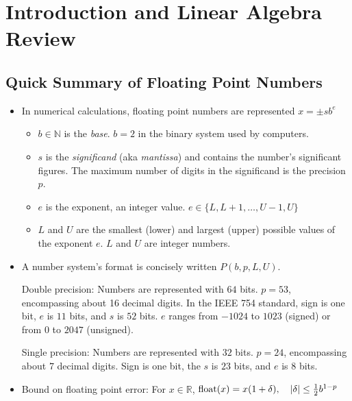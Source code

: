 \documentclass[11pt, a4paper]{article}
\newcommand{\R}{\mathbb{R}} %
\begin{document}
\newpage

\tableofcontents

\newpage

\section{Introduction and Linear Algebra Review}

\subsection{Quick Summary of Floating Point Numbers}
\begin{itemize}
	\item In numerical calculations, floating point numbers are represented $ x = \pm s b^{e} $
	\begin{itemize}
		\item $ b \in \mathbb{N}$ is the \textit{base}. $ b = 2 $ in the binary system used by computers.
		\item $ s $ is the \textit{significand} (aka \textit{mantissa}) and contains the number's significant figures. The maximum number of digits in the significand is the precision $ p $.

		\item $ e $ is the exponent, an integer value. $ e \in \{L, L+1, \dots, U-1, U \} $
		
		\item $ L $ and $ U $ are the smallest (lower) and largest (upper) possible values of the exponent $ e $. $ L $ and $ U $ are integer numbers.
	\end{itemize}
	
	\item A number system's format is concisely written $ P(b, p, L, U) $. 
	
	Double precision: Numbers are represented with $ 64 $ bits. $ p = 53 $, encompassing about 16 decimal digits. In the IEEE 754 standard, sign is one bit, $ e $ is $ 11 $ bits, and $ s $ is $ 52 $ bits. $ e $ ranges from $ -1024 $ to $ 1023 $ (signed) or from $ 0 $ to $ 2047 $ (unsigned).
	
	Single precision: Numbers are represented with $ 32 $ bits.	$ p = 24 $, encompassing about $ 7 $ decimal digits. Sign is one bit, the $ s $ is $ 23 $ bits, and $ e $ is 8 bits.
	
	\item Bound on floating point error: For $ x \in \R $, $ \operatorname{float}(x) = x(1 + \delta), \quad \abs{\delta} \leq \frac{1}{2} b^{1-p} $
\end{itemize}
\end{document}
